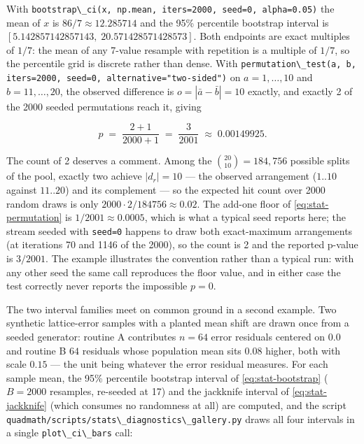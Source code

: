 \documentclass[
  10pt,
]{article}
\newcommand{\passthrough}[1]{#1}
\begin{document}
With
\passthrough{\lstinline!bootstrap\_ci(x, np.mean, iters=2000, seed=0, alpha=0.05)!}
the mean of \(x\) is \(86/7 \approx 12.285714\) and the 95\% percentile
bootstrap interval is \([5.142857142857143,\; 20.571428571428573]\).
Both endpoints are exact multiples of \(1/7\): the mean of any 7-value
resample with repetition is a multiple of \(1/7\), so the percentile
grid is discrete rather than dense. With
\passthrough{\lstinline!permutation\_test(a, b, iters=2000, seed=0, alternative="two-sided")!}
on \(a = 1,\dots,10\) and \(b = 11,\dots,20\), the observed difference
is \(o = |\bar{a} - \bar{b}| = 10\) exactly, and exactly 2 of the 2000
seeded permutations reach it, giving

\begin{equation}
\label{eq:stat-example-p}
p \;=\; \frac{2 + 1}{2000 + 1} \;=\; \frac{3}{2001}
\;\approx\; 0.00149925 .
\end{equation}

The count of 2 deserves a comment. Among the
\(\binom{20}{10} = 184{,}756\) possible splits of the pool, exactly two
achieve \(|d_r| = 10\) --- the observed arrangement (\(1..10\) against
\(11..20\)) and its complement --- so the expected hit count over 2000
random draws is only \(2000 \cdot 2/184756 \approx 0.02\). The add-one
floor of \eqref{eq:stat-permutation} is \(1/2001 \approx 0.0005\), which
is what a typical seed reports here; the stream seeded with
\passthrough{\lstinline!seed=0!} happens to draw both exact-maximum
arrangements (at iterations 70 and 1146 of the 2000), so the count is 2
and the reported p-value is \(3/2001\). The example illustrates the
convention rather than a typical run: with any other seed the same call
reproduces the floor value, and in either case the test correctly never
reports the impossible \(p = 0\).

The two interval families meet on common ground in a second example. Two
synthetic lattice-error samples with a planted mean shift are drawn once
from a seeded generator: routine A contributes \(n = 64\) error
residuals centered on \(0.0\) and routine B \(64\) residuals whose
population mean sits \(0.08\) higher, both with scale \(0.15\) --- the
unit being whatever the error residual measures. For each sample mean,
the 95\% percentile bootstrap interval of \eqref{eq:stat-bootstrap}
(\(B = 2000\) resamples, re-seeded at 17) and the jackknife interval of
\eqref{eq:stat-jackknife} (which consumes no randomness at all) are
computed, and the script
\passthrough{\lstinline!quadmath/scripts/stats\_diagnostics\_gallery.py!}
draws all four intervals in a single
\passthrough{\lstinline!plot\_ci\_bars!} call:
\end{document}

